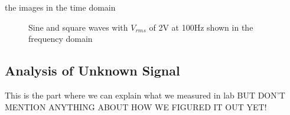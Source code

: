 \documentclass[letterpaper,12pt]{article}
\begin{document}
the images in the time domain

\begin{figure}[h!]
\centering
{}
\quad
{}
\caption{Sine and square waves with $V_{rms}$ of 2V at 100Hz shown in the frequency domain}
\end{figure}





\subsection{Analysis of Unknown Signal}
This is the part where we can explain what we measured in lab BUT DON'T MENTION ANYTHING ABOUT HOW WE FIGURED IT OUT YET!
\end{document}
